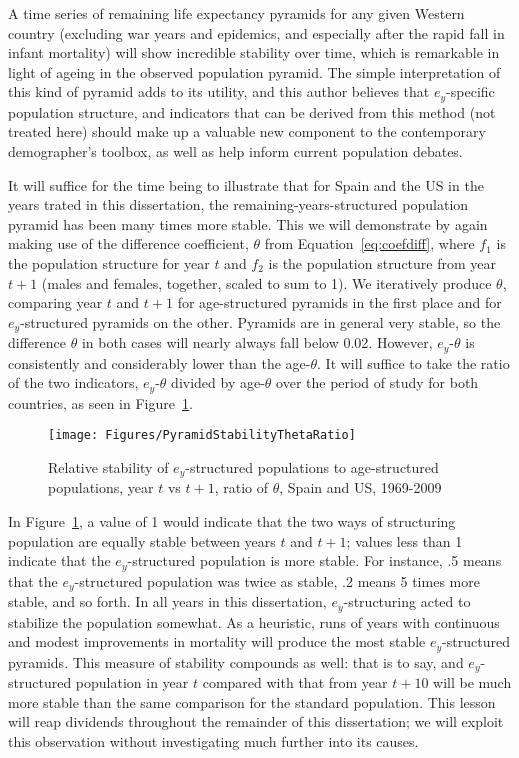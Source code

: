 A time series of remaining life expectancy pyramids for any given Western 
country (excluding war years and epidemics, and especially after the rapid fall
in infant mortality) will show incredible stability over time, which is
remarkable in light of ageing in the observed population pyramid. The simple 
interpretation of this kind of pyramid adds to its utility, and this author 
believes that $e_y$-specific population structure, and
indicators that can be derived from this method (not treated here) should 
make up a valuable new component to the contemporary demographer's toolbox, as well 
as help inform current population debates. 

It will suffice for the time being to
illustrate that for Spain and the US in the years trated in this dissertation,
the remaining-years-structured population pyramid has been many times more
stable. This we will demonstrate by again making use of the difference
coefficient, $\theta$ from Equation~\ref{eq:coefdiff}, where $f_1$ is the
population structure for year $t$ and $f_2$ is the population structure from
year $t+1$ (males and females, together, scaled to sum to 1). We iteratively
produce $\theta$, comparing year $t$ and $t+1$ for age-structured pyramids in
the first place and for $e_y$-structured pyramids on the other. Pyramids are in
general very stable, so the difference $\theta$ in both cases will nearly always
fall below 0.02. However, $e_y$-$\theta$ is consistently and considerably lower
than the age-$\theta$. It will suffice to take the ratio of the two indicators,
 $e_y$-$\theta$ divided by age-$\theta$ over the period of study for both
 countries, as seen in Figure~\ref{fig:PyramidStability}.

\begin{figure}
      \centering
      \caption{Relative stability of $e_y$-structured populations to
                age-structured populations, year $t$ vs $t+1$, ratio of
                $\theta$, Spain and US, 1969-2009} 
         \texttt{[image: Figures/PyramidStabilityThetaRatio]}
      \label{fig:PyramidStability} 
\end{figure}

In Figure~\ref{fig:PyramidStability}, a value of 1 would indicate that the two
ways of structuring population are equally stable between years $t$ and $t+1$;
values less than 1 indicate that the $e_y$-structured population is more stable.
For instance, .5 means that the $e_y$-structured population was twice as stable,
.2 means 5 times more stable, and so forth. In all years in this dissertation,
$e_y$-structuring acted to stabilize the population somewhat. As a heuristic,
runs of years with continuous and modest improvements in mortality will produce
the most stable $e_y$-structured pyramids. This measure of stability compounds
as well: that is to say, and $e_y$-structured population in year $t$
compared with that from year $t+10$ will be much more stable than the same
comparison for the standard population. This lesson will reap dividends
throughout the remainder of this dissertation; we will exploit this observation
without investigating much further into its causes.

